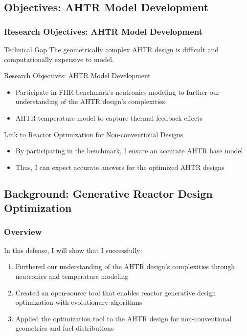 \subsection{Objectives: AHTR Model Development}
    \begin{frame}
        \frametitle{Research Objectives: AHTR Model Development}
        \begin{block}{Technical Gap}
            The geometrically complex AHTR design is difficult and computationally 
            expensive to model. 
        \end{block}
        \begin{block}{Research Objectives: AHTR Model Development}
        \begin{itemize}
            \item Participate in FHR benchmark's neutronics modeling to further our 
            understanding of the AHTR design's complexities
            \item AHTR temperature model to capture thermal feedback effects
        \end{itemize}
        \end{block}
        \begin{block}{Link to Reactor Optimization for Non-conventional Designs}
        \begin{itemize}
        \item By participating in the benchmark, I ensure an accurate AHTR base model
        \item Thus, I can expect accurate answers for the optimized AHTR designs
        \end{itemize}
        \end{block}
    \end{frame}

\subsection{Background: Generative Reactor Design Optimization}
\begin{frame}
    \frametitle{Overview}
    In this defense, I will show that I successfully: 
    \begin{enumerate}
        \item Furthered our understanding of the \gls{AHTR} design's complexities 
        through neutronics and temperature modeling
        \item Created an open-source tool that enables reactor generative 
        design optimization with evolutionary algorithms
        \item Applied the optimization tool to the \gls{AHTR} design for 
        non-conventional geometries and fuel distributions 
    \end{enumerate}
\end{frame}

